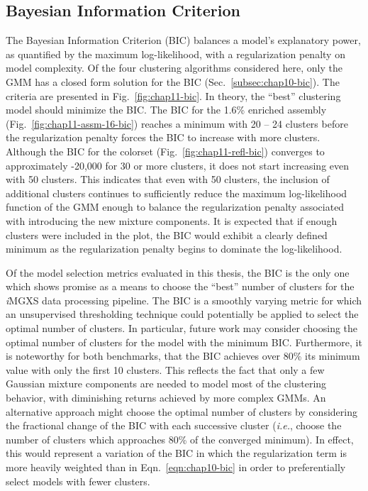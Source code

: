 \clearpage

\subsection{Bayesian Information Criterion}
\label{subsec:chap11-bic}

The Bayesian Information Criterion (BIC) balances a model's explanatory power, as quantified by the maximum log-likelihood, with a regularization penalty on model complexity. Of the four clustering algorithms considered here, only the \ac{GMM} has a closed form solution for the BIC (Sec.~\ref{subsec:chap10-bic}). The criteria are presented in Fig.~\ref{fig:chap11-bic}. In theory, the ``best'' clustering model should minimize the BIC. The BIC for the 1.6\% enriched assembly (Fig.~\ref{fig:chap11-assm-16-bic}) reaches a minimum with 20 -- 24 clusters before the regularization penalty forces the BIC to increase with more clusters. Although the BIC for the colorset (Fig.~\ref{fig:chap11-refl-bic}) converges to approximately -20,000 for 30 or more clusters, it does not start increasing even with 50 clusters. This indicates that even with 50 clusters, the inclusion of additional clusters continues to sufficiently reduce the maximum log-likelihood function of the \ac{GMM} enough to balance the regularization penalty associated with introducing the new mixture components. It is expected that if enough clusters were included in the plot, the BIC would exhibit a clearly defined minimum as the regularization penalty begins to dominate the log-likelihood.

Of the model selection metrics evaluated in this thesis, the BIC is the only one which shows promise as a means to choose the ``best'' number of clusters for the \textit{i}\ac{MGXS} data processing pipeline. The BIC is a smoothly varying metric for which an unsupervised thresholding technique could potentially be applied to select the optimal number of clusters. In particular, future work may consider choosing the optimal number of clusters for the model with the minimum BIC. Furthermore, it is noteworthy for both benchmarks, that the BIC achieves over 80\% its minimum value with only the first 10 clusters. This reflects the fact that only a few Gaussian mixture components are needed to model most of the clustering behavior, with diminishing returns achieved by more complex \acp{GMM}. An alternative approach might choose the optimal number of clusters by considering the fractional change of the BIC with each successive cluster (\textit{i.e.}, choose the number of clusters which approaches 80\% of the converged minimum). In effect, this would represent a variation of the BIC in which the regularization term is more heavily weighted than in Eqn.~\ref{eqn:chap10-bic} in order to preferentially select models with fewer clusters.

